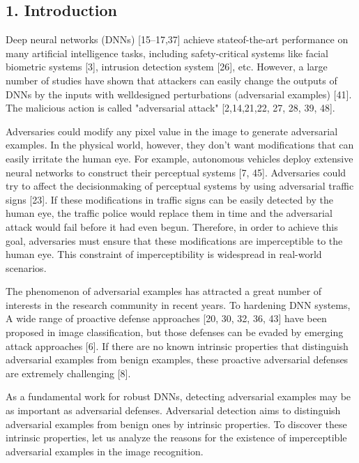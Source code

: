 \documentclass{article}
\begin{document}
\subsection{1. Introduction}

Deep neural networks (DNNs) [15–17,37] achieve stateof-the-art performance on many artificial intelligence tasks, including safety-critical systems like facial biometric systems [3], intrusion detection system [26], etc. However, a large number of studies have shown that attackers can easily change the outputs of DNNs by the inputs with welldesigned perturbations (adversarial examples) [41]. The malicious action is called "adversarial attack" [2,14,21,22, 27, 28, 39, 48].

Adversaries could modify any pixel value in the image to generate adversarial examples. In the physical world, however, they don't want modifications that can easily irritate the human eye. For example, autonomous vehicles deploy extensive neural networks to construct their perceptual systems [7, 45]. Adversaries could try to affect the decisionmaking of perceptual systems by using adversarial traffic signs [23]. If these modifications in traffic signs can be easily detected by the human eye, the traffic police would replace them in time and the adversarial attack would fail before it had even begun. Therefore, in order to achieve this goal, adversaries must ensure that these modifications are imperceptible to the human eye. This constraint of imperceptibility is widespread in real-world scenarios.

The phenomenon of adversarial examples has attracted a great number of interests in the research community in recent years. To hardening DNN systems, A wide range of proactive defense approaches [20, 30, 32, 36, 43] have been proposed in image classification, but those defenses can be evaded by emerging attack approaches [6]. If there are no known intrinsic properties that distinguish adversarial examples from benign examples, these proactive adversarial defenses are extremely challenging [8].

As a fundamental work for robust DNNs, detecting adversarial examples may be as important as adversarial defenses. Adversarial detection aims to distinguish adversarial examples from benign ones by intrinsic properties. To discover these intrinsic properties, let us analyze the reasons for the existence of imperceptible adversarial examples in the image recognition.
\end{document}
